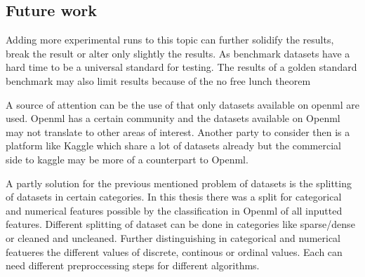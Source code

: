 \documentclass[a4paper,10pt]{article}
\begin{document}




\subsection{Future work}
Adding more experimental runs to this topic can further solidify the results, break the result or alter only slightly the results. As benchmark datasets have a hard time to be a universal standard for testing. The results of a golden standard benchmark may also limit results because of the no free lunch theorem

A source of attention can be the use of that only datasets available on openml are used. Openml has a certain community and the datasets available on Openml may not translate to other areas of interest. Another party to consider then is a platform like Kaggle which share a lot of datasets already but the commercial side to kaggle may be more of a counterpart to Openml. 

A partly solution for the previous mentioned problem of datasets is the splitting of datasets in certain categories. In this thesis there was a split for categorical and numerical features possible by the classification in Openml of all inputted features. Different splitting of dataset can be done in categories like sparse/dense or cleaned and uncleaned. Further distinguishing in categorical and numerical featueres the different values of discrete, continous or ordinal values. Each can need different preproccessing steps for different algorithms. 
\end{document}

